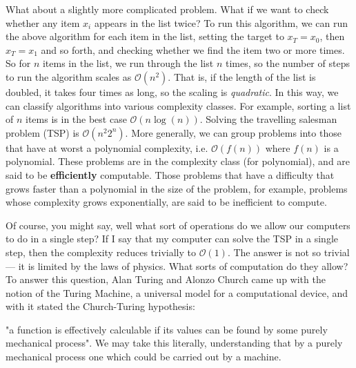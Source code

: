 What about a slightly more complicated problem. What if we want to check whether any item $x_i$ appears
in the list twice? To run this algorithm, we can run the above algorithm for each item in the list, setting the
target to $x_T = x_0$, then $x_T = x_1$ and so forth, and checking whether we find the item two or more
times. So for $n$ items in the list, we run through the list $n$ times, so the number of steps to run
the algorithm scales as $\mathcal{O}(n^2)$. That is, if the length of the list is doubled, it takes
four times as long, so the scaling is \emph{quadratic}.
In this way, we can classify algorithms into various complexity classes. For example, sorting a list
of $n$ items is in the best case $\mathcal{O}(n \log(n))$. Solving the travelling salesman problem (TSP) is
$\mathcal{O}(n^2 2^n)$. More generally, we can group problems into those that have at worst a polynomial
complexity, i.e. $\mathcal{O}\left(f(n)\right)$ where $f(n)$ is a polynomial. These problems are 
in the complexity class  (for polynomial), and are said to be \textbf{efficiently} computable.
Those problems that have a difficulty that grows faster than a polynomial in the size of the problem, 
for example, problems whose complexity grows exponentially, are said to be inefficient to compute.

Of course, you might say, well what sort of operations do we allow our computers to do in a single step?
If I say that my computer can solve the TSP in a single step, then the complexity reduces trivially to
$\mathcal{O}(1)$. The answer is not so trivial --- it is limited by the laws of physics. What sorts
of computation do they allow? To answer this question, Alan Turing and Alonzo Church came up with the notion of 
the Turing Machine, a universal model for a computational device, and with it stated the Church-Turing 
hypothesis:

\begin{displayquote}
  "a function is effectively calculable if its values can be found by some purely mechanical process". 
  We may take this literally, understanding that by a purely mechanical process one which could be carried out by a machine.
\end{displayquote}

